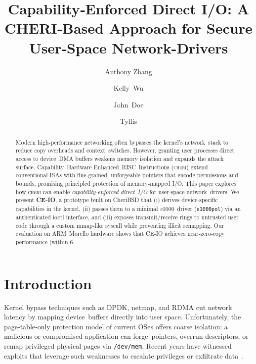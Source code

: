 \documentclass[sigconf]{acmart}
\title{Capability‑Enforced Direct I/O: A CHERI‑Based Approach for Secure User‑Space Network-Drivers}
\author{Anthony Zhang}
\affiliation{\institution{Northwestern University}\country{USA}}
\author{Kelly Wu}
\affiliation{\institution{Northwestern University}\country{USA}}
\author{John Doe}
\affiliation{\institution{Northwestern University}\country{USA}}
\author{Tyllis}
\affiliation{\institution{Northwestern University}\country{USA}}
\newcommand{\cheri}{\textsc{cheri}\xspace}
\newcommand{\e}{\textit{e}1000\xspace}
\begin{document}
\begin{abstract}
Modern high‑performance networking often bypasses the kernel’s network stack to reduce copy overheads and context switches. However, granting user processes direct access to device DMA buffers weakens memory isolation and expands the attack surface. Capability Hardware Enhanced RISC Instructions (\cheri) extend conventional ISAs with fine‑grained, unforgeable pointers that encode permissions and bounds, promising principled protection of memory‑mapped I/O. This paper explores how \cheri can enable \emph{capability‑enforced direct I/O} for user‑space network drivers.
We present \textbf{CE‑IO}, a prototype built on CheriBSD that (i) derives device‑specific capabilities in the kernel, (ii) passes them to a minimal \e driver (\texttt{e1000pol}) via an authenticated ioctl interface, and (iii) exposes transmit/receive rings to untrusted user code through a custom mmap‑like syscall while preventing illicit remapping. Our evaluation on ARM Morello hardware shows that CE‑IO achieves near‑zero‑copy performance (within 6 %
\end{abstract}



\newpage
\maketitle
\tableofcontents







\section{Introduction}
\label{sec:intro}
Kernel bypass techniques such as DPDK, netmap, and RDMA cut network latency by mapping device buffers directly into user space. Unfortunately, the page‑table‑only protection model of current OSes offers coarse isolation: a malicious or compromised application can forge pointers, overrun descriptors, or remap privileged physical pages via \texttt{/dev/mem}. Recent years have witnessed exploits that leverage such weaknesses to escalate privileges or exfiltrate data \cite{netmapCVE}.  
\end{document}
